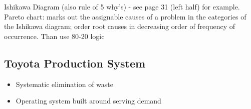 \documentclass{scrartcl}
\begin{document}
Ishikawa Diagram (also rule of 5 why's) - see page 31 (left half) for example.\\
Pareto chart: marks out the assignable causes of a problem in the categories of the Ishikawa diagram; order root causes in decreasing order of frequency of occurrence. Than use 80-20 logic

\subsection{Toyota Production System}
\label{sec:07-07}

\begin{itemize}
\item Systematic elimination of waste
\item Operating system built around serving demand
\end{itemize}
\end{document}
